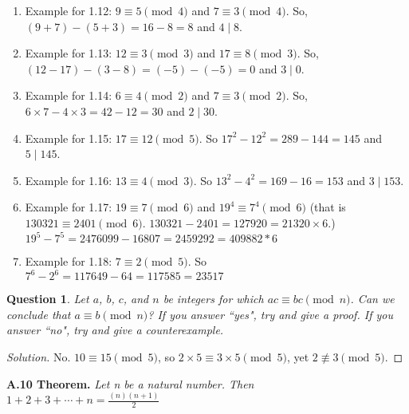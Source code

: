\documentclass[12pt,leqno]{article}
\numberwithin{equation}{section}
\newtheorem{ques}[thm]{Question}
\theoremstyle{definition}
\begin{document}
\begin{enumerate}

\item Example for 1.12: $9 \equiv 5 \pmod{4}$ and $7 \equiv 3 \pmod{4}$.  So, $(9 + 7) - (5 + 3) = 16 - 8 = 8$ and $4 \mid 8$.
\item Example for 1.13: $12 \equiv 3 \pmod{3}$ and $17 \equiv 8 \pmod{3}$.  So, $(12 - 17) - (3 - 8) = (-5) - (-5) = 0$ and $3 \mid 0$.
\item Example for 1.14: $6 \equiv 4 \pmod{2}$ and $7 \equiv 3 \pmod{2}$.  So, $6 \times 7 - 4 \times 3 = 42 - 12 = 30$ and $2 \mid 30$.
\item Example for 1.15: $17 \equiv 12 \pmod{5}$.  So $17^2 - 12^2 = 289 - 144 = 145$ and $5 \mid 145$.
\item Example for 1.16: $13 \equiv 4 \pmod{3}$.  So $13^2 - 4^2 = 169 - 16 = 153$ and $3 \mid 153$.
\item Example for 1.17: $19 \equiv 7 \pmod{6}$ and  $19^4 \equiv 7^4 \pmod{6}$ (that is $130321 \equiv 2401 \pmod{6}$.  $130321 - 2401 = 127920 = 21320 \times 6$.)  $19^5 - 7^5 = 2476099 - 16807 = 2459292 = 409882 * 6$
\item Example for 1.18: $7 \equiv 2 \pmod{5}$.  So $7^6 - 2^6 = 117649 - 64 = 117585 = 23517$

\end{enumerate}

\begin{ques}
Let $a$, $b$, $c$, and $n$ be integers for which $ac \equiv bc
\pmod{n}$. Can we conclude that $a \equiv b \pmod{n}$? If you answer
``yes", try and give a proof. If you answer ``no", try and give a
counterexample.
\end{ques}

\begin{proof}[Solution]
No.  $10 \equiv 15 \pmod{5}$, so $2 \times 5 \equiv 3 \times 5 \pmod{5}$, yet $2 \not \equiv 3 \pmod{5}$.
\end{proof}



\pagebreak

\noindent \textbf{A.10 Theorem.} \emph{Let n be a natural number. Then $1+2+3+\cdots + n=\frac{(n)(n+1)}{2}$}
\end{document}
